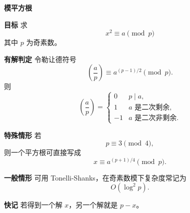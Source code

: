 \textbf{模平方根}

\textbf{目标}
求
\[
x^2\equiv a\pmod p
\]
其中 $p$ 为奇素数。

\textbf{有解判定}
令勒让德符号
\[
\left(\frac{a}{p}\right)\equiv a^{(p-1)/2}\pmod p.
\]
则
\[
\left(\frac{a}{p}\right)=
\begin{cases}
0 & p\mid a,\\
1 & a \text{ 是二次剩余},\\
-1 & a \text{ 是二次非剩余}.
\end{cases}
\]

\textbf{特殊情形}
若
\[
p\equiv 3\pmod 4,
\]
则一个平方根可直接写成
\[
x\equiv a^{(p+1)/4}\pmod p.
\]

\textbf{一般情形}
可用 Tonelli-Shanks，在奇素数模下复杂度常记为
\[
O(\log^2 p).
\]

\textbf{快记}
若得到一个解 $x$，另一个解就是 $p-x$。
